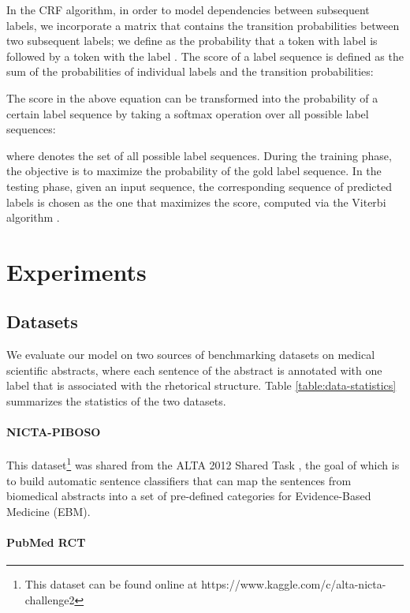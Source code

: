 \documentclass[11pt,a4paper]{article}
\begin{document}
In the CRF algorithm, in order to model dependencies between subsequent labels, we incorporate a matrix  that contains the transition probabilities between two subsequent labels; we define  as the probability that a token with label  is followed by a token with the label . The score of a label sequence  is defined as the sum of the probabilities of individual labels and the transition probabilities:


The score in the above equation can be transformed into the probability of a certain label sequence by taking a softmax operation over all possible label sequences:


where  denotes the set of all possible label sequences. During the training phase, the objective is to maximize the probability of the gold label sequence. In the testing phase, given an input sequence, the corresponding sequence of predicted labels is chosen as the one that maximizes the score, computed via the Viterbi algorithm \cite{forney1973viterbi}.


\section{Experiments}

\subsection{Datasets}

We evaluate our model on two sources of benchmarking datasets on medical scientific abstracts, where each sentence of the abstract is annotated with one label that is associated with the rhetorical structure. Table \ref{table:data-statistics} summarizes the statistics of the two datasets.


\paragraph{NICTA-PIBOSO}

This dataset\footnote{This dataset can be found online at https://www.kaggle.com/c/alta-nicta-challenge2} was shared from the ALTA 2012 Shared Task \cite{amini2012overview}, the goal of which is to build automatic sentence classifiers that can map the sentences from biomedical abstracts into a set of pre-defined categories for Evidence-Based Medicine (EBM).

\paragraph{PubMed RCT}
\end{document}
